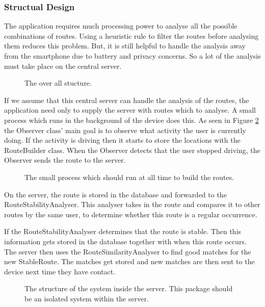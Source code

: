 \subsubsection{Structual Design}
The application requires much processing power to analyse all the possible combinations of routes.
Using a heuristic rule to filter the routes before analysing them reduces this problem.
But, it is still helpful to handle the analysis away from the smartphone due to battery and privacy concerns.
So a lot of the analysis must take place on the central server.

\begin{figure}[h]
	\centering
	
	\caption{The over all stucture.}
	\label{fig:packageDiagramSprint1}
\end{figure}

If we assume that this central server can handle the analysis of the routes, the application need only to supply the server with routes which to analyse.
A small process which runs in the background of the device does this.
As seen in Figure \ref{fig:classDiagramSprint1Observer} the Observer class' main goal is to observe what activity the user is currently doing.
If the activity is driving then it starts to store the locations with the RouteBuilder class.
When the Observer detects that the user stopped driving, the Observer sends the route to the server.

\begin{figure}[h]
	\centering
	
	\caption{The small process which should run at all time to build the routes.}
	\label{fig:classDiagramSprint1Observer}
\end{figure}

On the server, the route is stored in the database and forwarded to the RouteStabilityAnalyser.
This analyser takes in the route and compares it to other routes by the same user, to determine whether this route is a regular occurrence.

If the RouteStabilityAnalyser determines that the route is stable.
Then this information gets stored in the database together with when this route occurs.
The server then uses the RouteSimilarityAnalyser to find good matches for the new StableRoute.
The matches get stored and new matches are then sent to the device next time they have contact.

\begin{figure}[h]
	\centering
	
	\caption{The structure of the system inside the server. This package should be an isolated system within the server.}
	\label{fig:classDiagramSprint1Server}
\end{figure}

